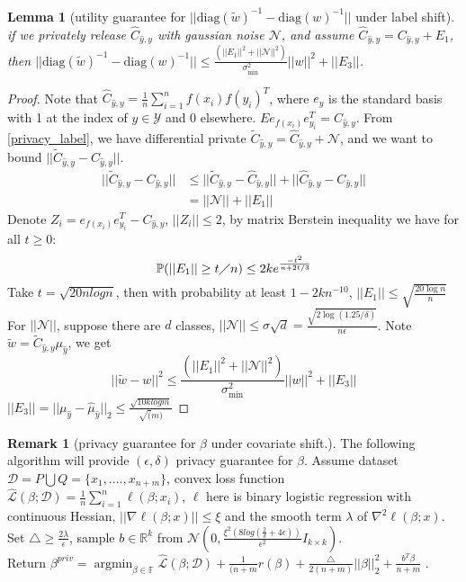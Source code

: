 \documentclass{article}
\newcommand{\argmin}{\mathop{\mathrm{argmin}}}
\def\diag{\mathrm{diag}}
\def\cD{\mathcal{D}}
\def\cL{\mathcal{L}}
\def\cN{\mathcal{N}}
\def\cY{\mathcal{Y}}
\newtheorem{lemma}{Lemma}
\theoremstyle{definition}
\newtheorem*{remark}{Remark}
\begin{document}
\begin{lemma}[{utility guarantee for $||{\diag(\tilde{w})}^{-1} - {\diag(w)}^{-1}||$} under label shift] 

if we privately release $\hat{C}_{\hat y,y}$ with gaussian noise $\cN$, and assume $\hat{C}_{\hat y,y} = C_{\hat y, y} + E_1$, then $||{\diag(\tilde{w})}^{-1} - {\diag(w)}^{-1}|| \leq \frac{(||E_1||^2 + ||\cN||^2)}{\sigma_{\min}^2}||w||^2 + ||E_3||$.
\end{lemma} 
\begin{proof}
	Note that $\hat C_{\hat y, y} = \frac{1}{n}\sum_{i=1}^nf(x_i)f(y_i)^T$, where $e_y$ is the standard basis with 1 at the index of $y \in \cY$ and 0 elsewhere. $E e_{f(x_i)}e_{y_i}^T = C_{\hat y,y}$. From \eqref{privacy_label}, we have differential private $\tilde {C}_{\hat y, y} = \hat C_{\hat y, y}  + \cN$, and we want to bound $||\tilde C_{\hat y,y} - C_{\hat y, y}||$.
	\begin{align}
	||\tilde C_{\hat y,y} - C_{\hat y, y}|| & \leq ||\tilde C_{\hat y,y} -\hat C_{\hat y, y}|| + ||\hat C_{\hat y,y} - C_{\hat y, y}|| \\
	& = ||\cN|| + ||E_1||
	\end{align}
	Denote $Z_i = e_{f(x_i)}e_{y_i}^T - C_{\hat y , y}$, $||Z_i|| \leq 2$, by matrix Berstein inequality we have for all $t \geq 0$:
	$$
	\mathbb{P}(||E_1|| \geq t \diagup n) \leq 2ke^{\frac{-t^2}{n+2t/3}}
	$$
	Take $t = \sqrt{20nlogn}$, then with probability at least $1 - 2kn^{-10}$, $||E_1|| \leq \sqrt{\frac{20 \log n}{n}}$
	For $||\cN||$, suppose there are $d$ classes, $||\cN|| \leq \sigma \sqrt{d} = \frac{\sqrt{2 \log(1.25 /\delta)}}{n \epsilon}$. Note $\tilde w = \tilde C_{\hat y, y} \mu_{\hat y}$, we get 
	$$
	||\tilde w  -w||^2 \leq \frac{(||E_1||^2 + ||\cN||^2)}{\sigma_{\min}^2}||w||^2 + ||E_3||
		$$
	$||E_3|| =||\mu_{\hat y} -\hat{\mu}_{\hat y}||_2 \leq{\frac{\sqrt{10k log m}}{\sqrt(m)}}$
\end{proof}
\begin{remark}[privacy guarantee for $\beta$ under covariate shift.] The following algorithm will provide $(\epsilon, \delta)$ privacy guarantee for $\beta$.
	Assume dataset $\cD = P \bigcup Q =\{x_1 ,....,x_{n+m}\}$, convex loss function $\hat{\cL}(\beta; \cD) = \frac{1}{n}\sum_{i=1}^n \ell(\beta; x_i)$, $\ell$ here is binary logistic regression with continuous Hessian, $||\nabla \ell(\beta;x)|| \leq \xi$ and the smooth term $\lambda$ of $\nabla^2 \ell(\beta; x)$. \\
	Set $\triangle \geq \frac{2\lambda}{\epsilon}$, sample $b \in \mathbb{R}^k$ from $\cN(0, \frac{\xi^2(8 log(\frac{2}{\delta}+4\epsilon))}{\epsilon^2}I_{k \times k})$. \\Return $\beta^{priv} = \argmin_{\beta \in \mathbb{F}} \hat{\cL}(\beta; \cD) + \frac{1}{(n+m}r(\beta) +\frac{\triangle}{2(n+m)}||\beta||_2^2+ \frac{b^T\beta}{n+m}$ . 
\end{remark}
\end{document}
